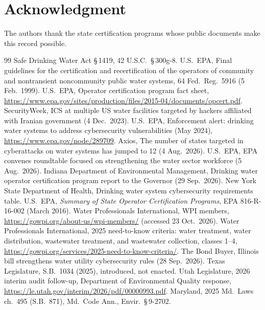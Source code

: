 \documentclass[10pt,twocolumn,letterpaper]{article}
\begin{document}
\section*{Acknowledgment}
The authors thank the state certification programs whose public documents make this record possible.

\begin{thebibliography}{99}\small\setlength{\itemsep}{1pt}
 Safe Drinking Water Act \S\,1419, 42 U.S.C.\ \S\,300g-8.
 U.S.\ EPA, Final guidelines for the certification and recertification of the operators of community and nontransient noncommunity public water systems, 64 Fed.\ Reg.\ 5916 (5 Feb.\ 1999).
 U.S.\ EPA, Operator certification program fact sheet, \url{https://www.epa.gov/sites/production/files/2015-04/documents/opcert.pdf}.
 SecurityWeek, ICS at multiple US water facilities targeted by hackers affiliated with Iranian government (4 Dec.\ 2023).
 U.S.\ EPA, Enforcement alert: drinking water systems to address cybersecurity vulnerabilities (May 2024), \url{https://www.epa.gov/node/289709}.
 Axios, The number of states targeted in cyberattacks on water systems has jumped to 12 (4 Aug.\ 2026).
 U.S.\ EPA, EPA convenes roundtable focused on strengthening the water sector workforce (5 Aug.\ 2026).
 Indiana Department of Environmental Management, Drinking water operator certification program report to the Governor (29 Sep.\ 2026).
 New York State Department of Health, Drinking water system cybersecurity requirements table.
 U.S.\ EPA, \emph{Summary of State Operator Certification Programs}, EPA 816-R-16-002 (March 2016).
 Water Professionals International, WPI members, \url{https://gowpi.org/about-us/wpi-members/} (accessed 23 Oct.\ 2026).
 Water Professionals International, 2025 need-to-know criteria: water treatment, water distribution, wastewater treatment, and wastewater collection, classes 1--4, \url{https://gowpi.org/services/2025-need-to-know-criteria/}.
 The Bond Buyer, Illinois bill strengthens water utility cybersecurity rules (28 Sep.\ 2026).
 Texas Legislature, S.B.\ 1034 (2025), introduced, not enacted.
 Utah Legislature, 2026 interim audit follow-up, Department of Environmental Quality response, \url{https://le.utah.gov/interim/2026/pdf/00000993.pdf}.
 Maryland, 2025 Md.\ Laws ch.\ 495 (S.B.\ 871), Md.\ Code Ann., Envir.\ \S\,9-2702.

\end{thebibliography}
\end{document}
